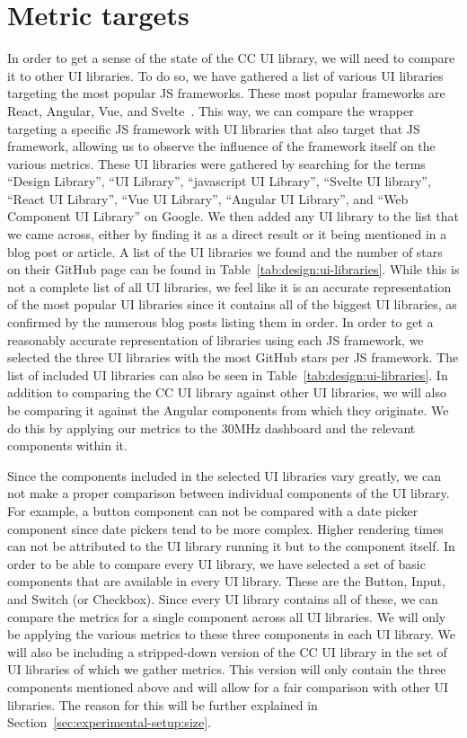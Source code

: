 \section{Metric targets}
In order to get a sense of the state of the CC UI library, we will need to compare it to other UI libraries. To do so, we have gathered a list of various UI libraries targeting the most popular JS frameworks. These most popular frameworks are React, Angular, Vue, and Svelte~. This way, we can compare the wrapper targeting a specific JS framework with UI libraries that also target that JS framework, allowing us to observe the influence of the framework itself on the various metrics. These UI libraries were gathered by searching for the terms ``Design Library'', ``UI Library'', ``javascript UI Library'', ``Svelte UI library'', ``React UI Library'', ``Vue UI Library'', ``Angular UI Library'', and ``Web Component UI Library'' on Google. We then added any UI library to the list that we came across, either by finding it as a direct result or it being mentioned in a blog post or article. A list of the UI libraries we found and the number of stars on their GitHub page can be found in Table~\ref{tab:design:ui-libraries}. While this is not a complete list of all UI libraries, we feel like it is an accurate representation of the most popular UI libraries since it contains all of the biggest UI libraries, as confirmed by the numerous blog posts listing them in order. In order to get a reasonably accurate representation of libraries using each JS framework, we selected the three UI libraries with the most GitHub stars per JS framework. The list of included UI libraries can also be seen in Table~\ref{tab:design:ui-libraries}. In addition to comparing the CC UI library against other UI libraries, we will also be comparing it against the Angular components from which they originate. We do this by applying our metrics to the 30MHz dashboard and the relevant components within it.

Since the components included in the selected UI libraries vary greatly, we can not make a proper comparison between individual components of the UI library. For example, a button component can not be compared with a date picker component since date pickers tend to be more complex. Higher rendering times can not be attributed to the UI library running it but to the component itself. In order to be able to compare every UI library, we have selected a set of basic components that are available in every UI library. These are the Button, Input, and Switch (or Checkbox). Since every UI library contains all of these, we can compare the metrics for a single component across all UI libraries. We will only be applying the various metrics to these three components in each UI library. We will also be including a stripped-down version of the CC UI library in the set of UI libraries of which we gather metrics. This version will only contain the three components mentioned above and will allow for a fair comparison with other UI libraries. The reason for this will be further explained in Section~\ref{sec:experimental-setup:size}.

